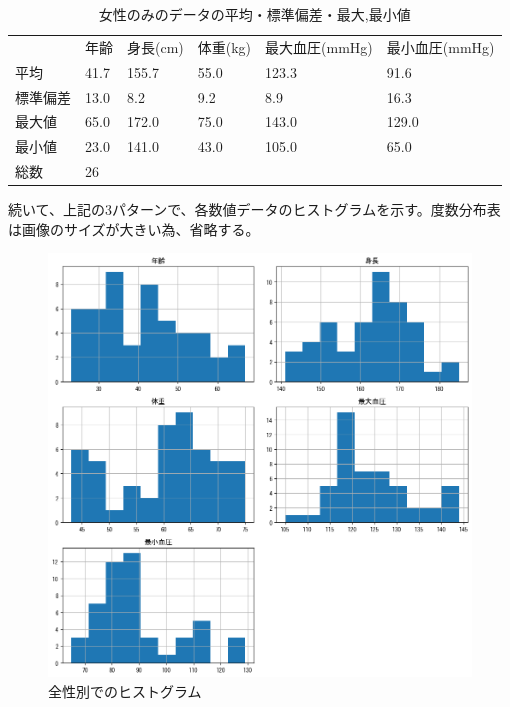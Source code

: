 \documentclass[dvipdfmx]{jsarticle}
\begin{document}
    \begin{table}[H]
        \caption{女性のみのデータの平均・標準偏差・最大,最小値}
        \centering
        \begin{tabular}{llllll}
            & \multicolumn{1}{r}{年齢} & \multicolumn{1}{r}{身長(cm)} & \multicolumn{1}{r}{体重(kg)} & \multicolumn{1}{r}{最大血圧(mmHg)} & \multicolumn{1}{r}{最小血圧(mmHg)} \\
        平均   & 41.7                   & 155.7                  & 55.0                   & 123.3                    & 91.6                     \\
        標準偏差 & 13.0                   & 8.2                    & 9.2                    & 8.9                      & 16.3                     \\
        最大値  & 65.0                   & 172.0                  & 75.0                   & 143.0                    & 129.0                    \\
        最小値  & 23.0                   & 141.0                  & 43.0                   & 105.0                    & 65.0                    \\
        \hline
        総数 & 26 &  &  &  &
        \end{tabular}
    \end{table}
    続いて、上記の3パターンで、各数値データのヒストグラムを示す。度数分布表は画像のサイズが大きい為、省略する。
    \begin{figure}[H]
        \centering
        \includegraphics[scale=0.6]{./images/allgender/hist.png}
        \caption{全性別でのヒストグラム}
    \end{figure}
\end{document}
